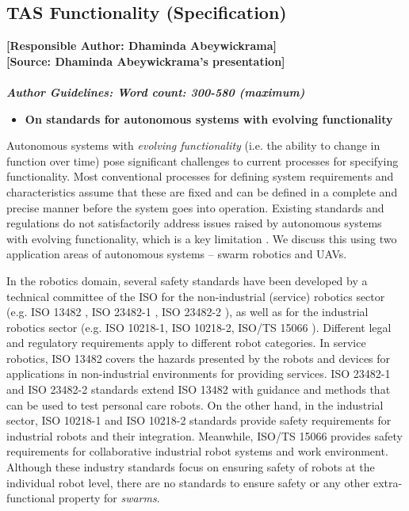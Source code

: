 \documentclass[sigconf]{acmart}
\begin{document}
\subsection{TAS Functionality (Specification)}
\noindent\textbf{[Responsible Author:  Dhaminda Abeywickrama]}\\
\noindent\textbf{[Source: Dhaminda Abeywickrama's presentation]}\\\\
\noindent\textbf{\textit{Author Guidelines: Word count: 300-580 (maximum)}}\\
\begin{itemize}
	\item \textbf{On standards for autonomous systems with evolving functionality}
\end{itemize}

Autonomous systems with \textit{evolving functionality} (i.e. the ability to change in function over time) pose significant challenges to current processes for specifying functionality. 
Most conventional processes for defining system requirements and characteristics assume that these are fixed and can be defined in a complete and precise manner before the system goes into operation. 
Existing standards and regulations do not satisfactorily address issues raised by autonomous systems with evolving functionality, which is a key limitation \cite{Fisher2020}. We discuss this using two application areas of autonomous systems -- swarm robotics and UAVs.

In the robotics domain, several safety standards have been developed by a technical committee of the ISO for the non-industrial (service) robotics sector (e.g. ISO 13482 \cite{ISO13482}, ISO 23482-1 \cite{ISO23482-1}, ISO 23482-2  \cite{ISO23482-2}), as well as for the industrial robotics sector (e.g. ISO 10218-1\cite{ISO10218-1}, ISO 10218-2\cite{ISO10218-2}, ISO/TS 15066 \cite{ISO15066}). 
Different legal and regulatory requirements apply to different robot categories. 
In service robotics, ISO 13482 covers the hazards presented by the robots and devices for applications in non-industrial environments for providing services. 
ISO 23482-1 and ISO 23482-2 standards extend ISO 13482 with guidance and methods that can be used to test personal care robots.
On the other hand, in the industrial sector, ISO 10218-1 and ISO 10218-2 standards provide safety requirements for industrial robots and their integration.
Meanwhile, ISO/TS 15066 provides safety requirements for collaborative industrial robot systems
and work environment. 
Although these industry standards focus on ensuring safety of robots at the individual robot level, there are no standards to ensure safety or any other extra-functional property for \textit{swarms}.
\end{document}
